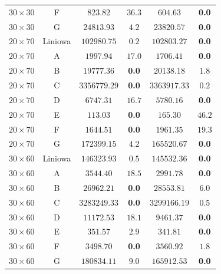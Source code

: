 \begin{table}[H]
\begin{center}
\begin{tabular}{c|c||c|c||c|c}
            $30 \times 30$ & F           & $823.82$ & $36.3$                     & $604.63$ & \textbf{0.0} \\
            $30 \times 30$ & G           & $24813.93$ & $4.2$                    & $23820.57$ & \textbf{0.0} \\
            \hline
            $20 \times 70$ & Liniowa     & $102980.75$ & $0.2$                   & $102803.27$ & \textbf{0.0} \\
            $20 \times 70$ & A           & $1997.94$ & $17.0$                    & $1706.41$ & \textbf{0.0} \\
            $20 \times 70$ & B           & $19777.36$ & \textbf{0.0}             & $20138.18$ & $1.8$ \\
            $20 \times 70$ & C           & $3356779.29$ & \textbf{0.0}           & $3363917.33$ & $0.2$ \\
            $20 \times 70$ & D           & $6747.31$ & $16.7$                    & $5780.16$ & \textbf{0.0} \\
            $20 \times 70$ & E           & $113.03$ & \textbf{0.0}               & $165.30$ & $46.2$ \\
            $20 \times 70$ & F           & $1644.51$ & \textbf{0.0}              & $1961.35$ & $19.3$ \\
            $20 \times 70$ & G           & $172399.15$ & $4.2$                   & $165520.67$ & \textbf{0.0} \\
            \hline
            $30 \times 60$ & Liniowa     & $146323.93$ & $0.5$                   & $145532.36$ & \textbf{0.0} \\
            $30 \times 60$ & A           & $3544.40$ & $18.5$                    & $2991.78$ & \textbf{0.0} \\
            $30 \times 60$ & B           & $26962.21$ & \textbf{0.0}             & $28553.81$ & $6.0$ \\
            $30 \times 60$ & C           & $3283249.33$ & \textbf{0.0}           & $3299166.19$ & $0.5$ \\
            $30 \times 60$ & D           & $11172.53$ & $18.1$                   & $9461.37$ & \textbf{0.0} \\
            $30 \times 60$ & E           & $351.57$ & $2.9$                      & $341.81$ & \textbf{0.0} \\
            $30 \times 60$ & F           & $3498.70$ & \textbf{0.0}              & $3560.92$ & $1.8$ \\
            $30 \times 60$ & G           & $180834.11$ & $9.0$                   & $165912.53$ & \textbf{0.0} \\

\end{tabular}
\end{center}
\end{table}
